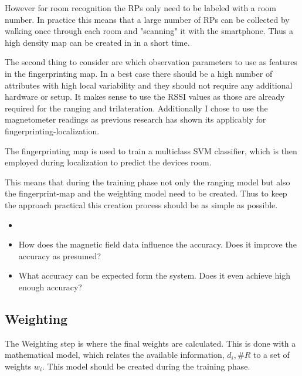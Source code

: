 However for room recognition the RPs only need to be labeled with a room number. In practice this means that a large number of RPs can be collected by walking once through each room and "scanning" it with the smartphone. Thus a high density map can be created in in a short time.

The second thing to consider are which observation parameters to use as features in the fingerprinting map. In a best case there should be a high number of attributes with high local variability and they should not require any additional hardware or setup. It makes sense to use the RSSI values as those are already required for the ranging and trilateration. Additionally I chose to use the magnetometer readings as previous research has shown its applicably for fingerprinting-localization.



The fingerprinting map is used to train a multiclass SVM classifier, which is then employed during localization to predict the devices room.

This means that during the training phase not only the ranging model but also the fingerprint-map and the weighting model need to be created. Thus to keep the approach practical this creation process should be as simple as possible.


\begin{itemize}
\item {}
\item How does the magnetic field data influence the accuracy. Does it improve the accuracy as presumed?
\item What accuracy can be expected form the system. Does it even achieve high enough accuracy?
\end{itemize}

\subsection{Weighting}

The Weighting step is where the final weights are calculated. This is done with a mathematical model, which relates the available information, \(d_i,\#R\) to a set of weights \(w_i\). This model should be created during the training phase.

